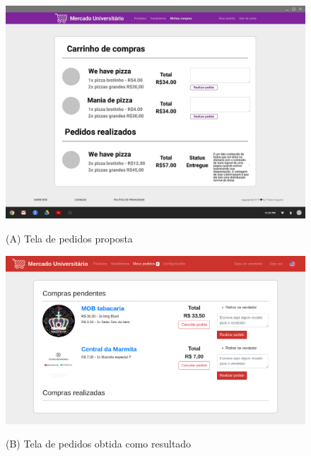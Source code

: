 \begin{figure}[htbp!]
  \centering
  \caption{(A) Tela de pedidos proposta}
  \includegraphics[width=1\textwidth]{figs/mockup/carrinho.jpg}
    \label{fig:err}
\end{figure}

\begin{figure}[htbp!]
  \centering
  \caption{(B) Tela de pedidos obtida como resultado}
  \includegraphics[width=1\textwidth]{figs/resultado/carrinho.png}
    \label{fig:err}
\end{figure}


